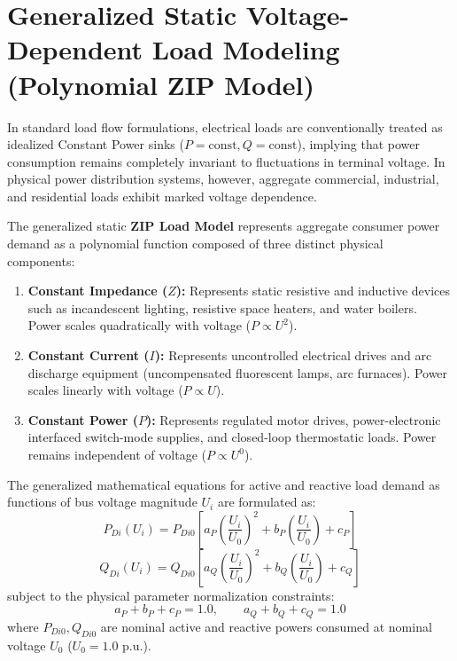 \documentclass[12pt,a4paper,oneside]{report}
\begin{document}
\section{Generalized Static Voltage-Dependent Load Modeling (Polynomial ZIP Model)}
In standard load flow formulations, electrical loads are conventionally treated as idealized Constant Power sinks ($P = \text{const}, Q = \text{const}$), implying that power consumption remains completely invariant to fluctuations in terminal voltage. In physical power distribution systems, however, aggregate commercial, industrial, and residential loads exhibit marked voltage dependence.

The generalized static \textbf{ZIP Load Model} represents aggregate consumer power demand as a polynomial function composed of three distinct physical components:
\begin{enumerate}
    \item \textbf{Constant Impedance ($Z$):} Represents static resistive and inductive devices such as incandescent lighting, resistive space heaters, and water boilers. Power scales quadratically with voltage ($P \propto U^2$).
    \item \textbf{Constant Current ($I$):} Represents uncontrolled electrical drives and arc discharge equipment (uncompensated fluorescent lamps, arc furnaces). Power scales linearly with voltage ($P \propto U$).
    \item \textbf{Constant Power ($P$):} Represents regulated motor drives, power-electronic interfaced switch-mode supplies, and closed-loop thermostatic loads. Power remains independent of voltage ($P \propto U^0$).
\end{enumerate}

The generalized mathematical equations for active and reactive load demand as functions of bus voltage magnitude $U_i$ are formulated as:
\begin{equation}
P_{Di}(U_i) = P_{Di0} \left[ a_P \left(\frac{U_i}{U_0}\right)^2 + b_P \left(\frac{U_i}{U_0}\right) + c_P \right]
\end{equation}
\begin{equation}
Q_{Di}(U_i) = Q_{Di0} \left[ a_Q \left(\frac{U_i}{U_0}\right)^2 + b_Q \left(\frac{U_i}{U_0}\right) + c_Q \right]
\end{equation}
subject to the physical parameter normalization constraints:
\begin{equation}
a_P + b_P + c_P = 1.0, \qquad a_Q + b_Q + c_Q = 1.0
\end{equation}
where $P_{Di0}, Q_{Di0}$ are nominal active and reactive powers consumed at nominal voltage $U_0$ ($U_0 = 1.0\text{ p.u.}$).
\end{document}
